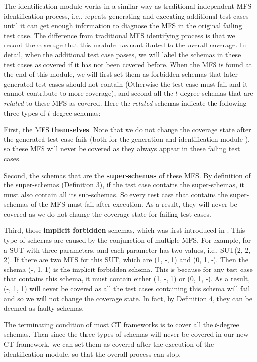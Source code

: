 \documentclass[10pt,journal,compsoc]{IEEEtran}
\begin{document}
The identification module works in a similar way as traditional independent MFS identification process, i.e., repeats generating and executing additional test cases until it can get enough information to diagnose the MFS in the original failing test case. The difference from traditional MFS identifying process is that we record the coverage that this module has contributed to the overall coverage. In detail, when the additional test case passes, we will label the schemas in these test cases as covered if it has not been covered before. When the MFS is found at the end of this module, we will first set them as forbidden schemas that later generated test cases should not contain (Otherwise the test case must fail and it cannot contribute to more coverage), and second all the $t$-degree schemas that are \emph{related} to these MFS as covered. Here the \emph{related} schemas indicate the following three types of $t$-degree schemas:

First, the MFS \textbf{themselves}. Note that we do not change the coverage state after the generated test case fails (both for the generation and identification module ), so these MFS will never be covered as they always appear in these failing test cases.

Second, the schemas that are the \textbf{super-schemas} of these MFS. By definition of the super-schemas (Definition 3), if the test case contains the super-schemas, it must also contain all its sub-schemas. So every test case that contains the super-schemas of the MFS must fail after execution. As a result, they will never be covered as we do not change the coverage state for failing test cases.

Third, those \textbf{implicit forbidden} schemas, which was first introduced in \cite{cohen2007interaction}.  This type of schemas are caused by the conjunction of multiple MFS. For example, for a SUT with three parameters, and each parameter has two values, i.e., SUT(2, 2, 2). If there are two MFS for this SUT, which are (1, -, 1) and (0, 1, -). Then the schema (-, 1, 1) is the implicit forbidden schema. This is because for any test case that contains this schema, it must contain either (1, -, 1) or (0, 1, -). As a result, (-, 1, 1) will never be covered as all the test cases containing this schema will fail and so we will not change the coverage state. In fact, by Definition 4, they can be deemed as faulty schemas.

The terminating condition of most CT frameworks is to cover all the $t$-degree schemas. Then since the three types of schemas will never be covered in our new CT framework, we can set them as covered after the execution of the identification module, so that the overall process can stop.
\end{document}
